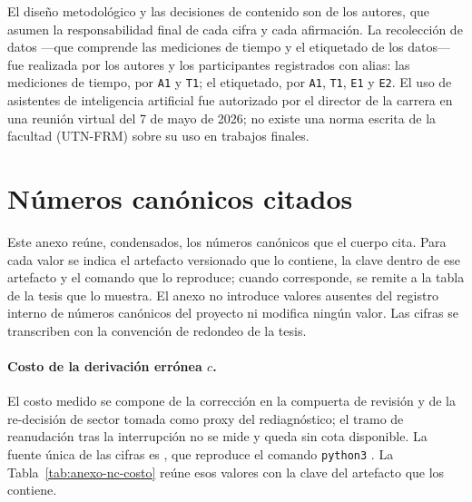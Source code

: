 El diseño metodológico y las decisiones de contenido son de los autores, que asumen la responsabilidad final de cada cifra y cada afirmación. La recolección de datos ---que comprende las mediciones de tiempo y el etiquetado de los datos--- fue realizada por los autores y los participantes registrados con alias: las mediciones de tiempo, por \texttt{A1} y \texttt{T1}; el etiquetado, por \texttt{A1}, \texttt{T1}, \texttt{E1} y \texttt{E2}. El uso de asistentes de inteligencia artificial fue autorizado por el director de la carrera en una reunión virtual del 7 de mayo de 2026; no existe una norma escrita de la facultad (UTN-FRM) sobre su uso en trabajos finales.

\section{Números canónicos citados}\label{sec:anexo-numeros-canonicos}

Este anexo reúne, condensados, los números canónicos que el cuerpo cita. Para cada valor se indica el artefacto versionado que lo contiene, la clave dentro de ese artefacto y el comando que lo reproduce; cuando corresponde, se remite a la tabla de la tesis que lo muestra. El anexo no introduce valores ausentes del registro interno de números canónicos del proyecto ni modifica ningún valor. Las cifras se transcriben con la convención de redondeo de la tesis.

\paragraph{Costo de la derivación errónea \(c\).}

El costo medido se compone de la corrección en la compuerta de revisión y de la re-decisión de sector tomada como proxy del rediagnóstico; el tramo de reanudación tras la interrupción no se mide y queda sin cota disponible. La fuente única de las cifras es , que reproduce el comando \texttt{python3} . La Tabla~\ref{tab:anexo-nc-costo} reúne esos valores con la clave del artefacto que los contiene.

